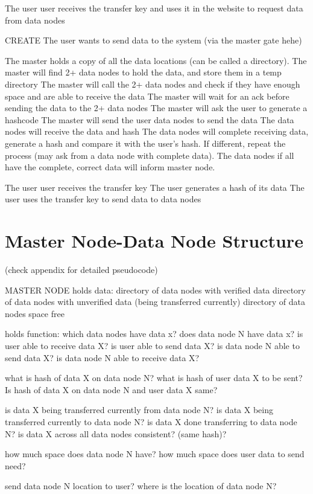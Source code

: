 \documentclass[acmsmall]{acmart}
\begin{document}
The user user receives the transfer key and uses it in the website to request data from data nodes

CREATE
The user wants to send data to the system (via the master gate hehe)

The master holds a copy of all the data locations (can be called a directory). 
The master will find 2+ data nodes to hold the data, and store them in a temp directory
The master will call the 2+ data nodes and check if they have enough space and are able to receive the data
The master will wait for an ack before sending the data to the 2+ data nodes
The master will ask the user to generate a hashcode
The master will send the user data nodes to send the data
The data nodes will receive the data and hash
The data nodes will complete receiving data, generate a hash and compare it with the user's hash. If different, repeat the process (may ask from a data node with complete data).
The data nodes if all have the complete, correct data will inform master node.

The user user receives the transfer key 
The user generates a hash of its data
The user uses the transfer key to send data to data nodes

\section{Master Node-Data Node Structure}
(check appendix for detailed pseudocode)


MASTER NODE
holds data:
directory of data nodes with verified data
directory of data nodes with unverified data (being transferred currently)
directory of data nodes space free

holds function:
which data nodes have data x?
does data node N have data x?
is user able to receive data X?
is user able to send data X?
is data node N able to send data X?
is data node N able to receive data X?


what is hash of data X on data node N?
what is hash of user data X to be sent?
Is hash of data X on data node N and user data X same?


is data X being transferred currently from data node N?
is data X being transferred currently to data node N?
is data X done transferring to data node N?
is data X across all data nodes consistent? (same hash)?

how much space does data node N have?
how much space does user data to send need?

send data node N location to user?
where is the location of data node N?
\end{document}
